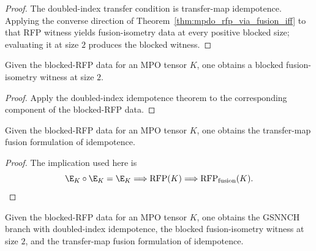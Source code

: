 \begin{proof}\leanok
    The doubled-index transfer condition is transfer-map idempotence. Applying
    the converse direction of
    Theorem~\ref{thm:mpdo_rfp_via_fusion_iff} to that RFP witness yields
    fusion-isometry data at every positive blocked size; evaluating it at size $2$
    produces the blocked witness.
\end{proof}

\begin{theorem}
    \label{thm:structural_implies_rfp_blocked_of_data}
    \leanok
    Given the blocked-RFP data for an MPO tensor $K$, one obtains a blocked
    fusion-isometry witness at size $2$.
\end{theorem}

\begin{proof}\leanok
    Apply the doubled-index idempotence theorem to the corresponding component
    of the blocked-RFP data.
\end{proof}

\begin{lemma}
    \label{lem:simple_mpdo_blocked_rfp_data_rfp_via_fusion}
    \leanok
    Given the blocked-RFP data for an MPO tensor $K$, one obtains the
    transfer-map fusion formulation of idempotence.
\end{lemma}

\begin{proof}\leanok
    The implication used here is
    \[
        \E_K\circ\E_K=\E_K
        \Longrightarrow \operatorname{RFP}(K)
        \Longrightarrow \operatorname{RFP}_{\mathrm{fusion}}(K).
    \]
\end{proof}

\begin{theorem}
    \label{thm:simple_mpdo_rfp_chain_of_data}
    \leanok
    Given the blocked-RFP data for an MPO tensor $K$, one obtains the
    GSNNCH branch with doubled-index idempotence, the blocked fusion-isometry
    witness at size $2$, and the transfer-map fusion formulation of
    idempotence.
\end{theorem}

